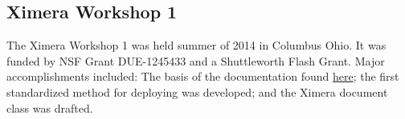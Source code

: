 \documentclass{ximera}
\begin{document}
\subsection*{Ximera Workshop 1}
The Ximera Workshop 1 was held summer of 2014 in Columbus Ohio. It was funded by NSF Grant DUE-1245433 and a Shuttleworth Flash Grant. Major accomplishments included: The basis of the documentation found \href{https://ximera.osu.edu/introduction/gettingStarted}{here}; the first standardized method for deploying was developed; and the Ximera document class was drafted.
\end{document}
